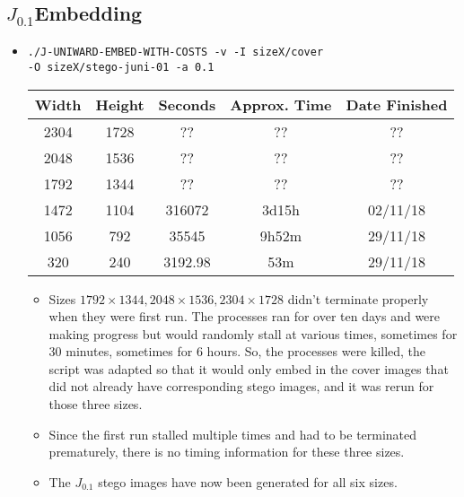 \documentclass[11pt,a4paper]{report}
\newcommand{\Jtern}{\texorpdfstring{$J_{0.1}$}{J(0.1)}}
\begin{document}
\subsection{\Jtern Embedding}
\begin{itemize}
\item \texttt{./J-UNIWARD-EMBED-WITH-COSTS -v -I sizeX/cover} \\
         \texttt{-O sizeX/stego-juni-01 -a 0.1}
  \begin{center}
  \begin{tabular}{ c c | c c c }
  Width & Height & Seconds & Approx. Time & Date Finished \\ \hline
  2304 & 1728 & ?? & ?? & ?? \\
  2048 & 1536 & ?? & ?? & ?? \\
  1792 & 1344 & ?? & ?? & ?? \\
  1472 & 1104 & 316072 & 3d15h & 02/11/18 \\
  1056 & 792 & 35545 & 9h52m & 29/11/18 \\
  320 & 240 & 3192.98 & 53m & 29/11/18 \\
  \end{tabular}
  \end{center}
  \begin{itemize}
  \item Sizes $1792 \times 1344, 2048 \times 1536, 2304 \times 1728$ didn't terminate properly when they were first run. The processes ran for over ten days and were making progress but would randomly stall at various times, sometimes for 30 minutes, sometimes for 6 hours. So, the processes were killed, the script was adapted so that it would only embed in the cover images that did not already have corresponding stego images, and it was rerun for those three sizes.
  \item Since the first run stalled multiple times and had to be terminated prematurely, there is no timing information for these three sizes.
  \item The $J_{0.1}$ stego images have now been generated for all six sizes.
  \end{itemize}
\end{itemize}
\end{document}
